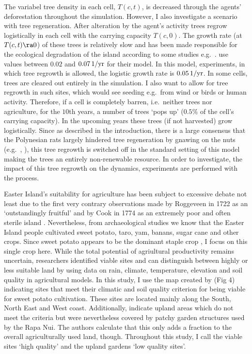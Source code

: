 The variabel tree density in each cell, $T(c,t)$, is decreased through the agents' deforestation throughout the simulation.
However, I also investigate a scenario with tree regeneration. After alteration by the agent's activity trees regrow logistically in each cell with the carrying capacity $T(c,0)$.
The growth rate (at $T(c,t)\ra 0$) of these trees is relatively slow and has been made responsible for the ecological degradation of the island according to some studies e.g.\ \citet{Brander1998}. 
\citet{Brandt2015} use values between $0.02$ and $0.07 \, \rm{1/yr}$ for their model.
In this model, experiments, in which tree regrowth is allowed, the logistic growth rate is $0.05\, \rm{1/yr}$. 
In some cells, trees are cleared out entirely in the simulation. 
I also want to allow for tree regrowth in such sites, which would see seeding e.g.\ from wind or birds or human activity.
Therefore, if a cell is completely barren, i.e.\ neither trees nor agriculture, for the $10$th years, a number of trees `pops up' ($0.5\%$ of the cell's carrying capacity).  
In the upcoming years these trees (if not harvested) grow logistically.
Since as described in the introduction, there is a large consensus that the Polynesian rats largely hindered tree regeneration by gnawing on the nuts (e.g.\ \citet{Hunt2007}, \citet{Bahn2017}), this tree regrowth is switched off in the standard setting of this model making the trees an entirely non-renewable resource. 
In order to investigate, the impact of this tree regrowth on the dynamics, experiments are performed with the process.

Easter Island's suitability for agriculture has been subject to excessive debate not least due to the first very contrary observations made by Roggeveen in 1722 as an `outstandingly fruitful' and by Cook in 1774 as an extremely poor and often sterile island \citep{Bahn2017}. %
Nevertheless, from archaeological studies we know that the Easter Island people cultivated sweet potato, taro, yam, banans, sugar cane and other crops.
Since sweet potato appears to be the dominant staple crop \citep{Louwagie2006}, I focus on this single crop here.
While the total potential of agriultural productivity remains uncertain, researchers identified viable sites and can distinguish between highly or less suitable land by using data on rain, climate, temperature, elevation and soil quality in agricultural models.
In this study, I use the map created by \citet{Puleston2017}(Fig 4) indicating sites that meet their climatic and soil quality criterion for being viable for sweet potato cultivation.
These sites are located mainly along the South, North East and West coast. 
Additionally, \citet{Puleston2017} indicate upland areas which do not meet the criteria but were nevertheless covered by patchy garden structures used by the Rapa Nui.
The authors calculate that this only adds a fraction to the overall agriculturally used land, though.
Throughout this study, I call the viable sites `high quality' and the upland gardens `low quality sites'.

